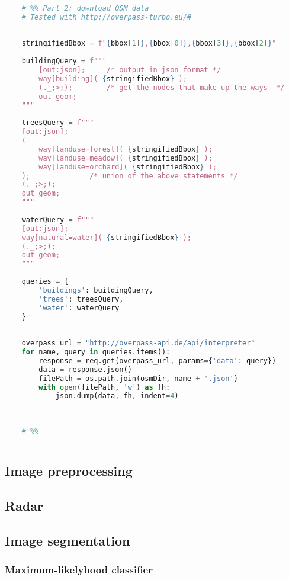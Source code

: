 \begin{lstlisting}[language=python]
    
    # %% Part 2: download OSM data
    # Tested with http://overpass-turbo.eu/#
    
    
    stringifiedBbox = f"{bbox[1]},{bbox[0]},{bbox[3]},{bbox[2]}"
    
    buildingQuery = f"""
        [out:json];     /* output in json format */
        way[building]( {stringifiedBbox} );
        (._;>;);        /* get the nodes that make up the ways  */
        out geom;
    """
    
    treesQuery = f"""
    [out:json];
    (
        way[landuse=forest]( {stringifiedBbox} );
        way[landuse=meadow]( {stringifiedBbox} );
        way[landuse=orchard]( {stringifiedBbox} );
    );              /* union of the above statements */
    (._;>;);
    out geom;
    """
    
    waterQuery = f"""
    [out:json];
    way[natural=water]( {stringifiedBbox} );
    (._;>;);
    out geom;
    """
    
    queries = {
        'buildings': buildingQuery,
        'trees': treesQuery,
        'water': waterQuery
    }
    
    
    overpass_url = "http://overpass-api.de/api/interpreter"
    for name, query in queries.items():
        response = req.get(overpass_url, params={'data': query})
        data = response.json()
        filePath = os.path.join(osmDir, name + '.json')
        with open(filePath, 'w') as fh:
            json.dump(data, fh, indent=4)
    
    
    
    # %%
    
\end{lstlisting}


\subsection{Image preprocessing}
\subsubsection{}
\subsection{Radar}
\subsection{Image segmentation}
\subsubsection{Maximum-likelyhood classifier}
